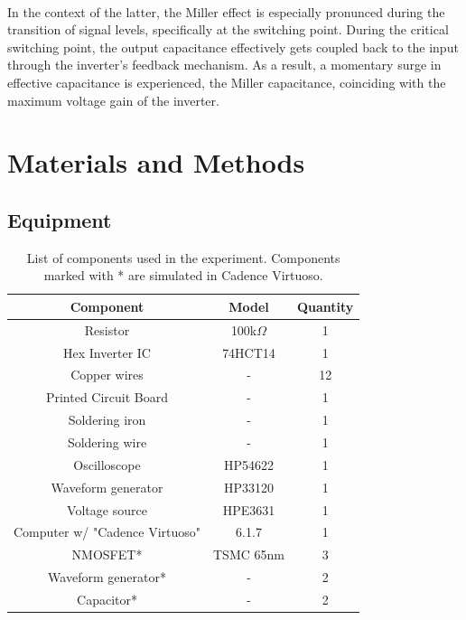 \documentclass[onecolumn]{article}
\begin{document}
\paragraph{} In the context of the latter, the Miller effect is especially pronunced during the transition of signal levels, specifically at the switching point. During the critical switching point, the output capacitance effectively gets coupled back to the input through the inverter's feedback mechanism. As a result, a momentary surge in effective capacitance is experienced, the Miller capacitance, coinciding with the maximum voltage gain of the inverter.


\section{Materials and Methods}
\subsection{Equipment}
\begin{table}[h!]
    \centering
    \begin{tabular}{|c|c|c|}
        \hline
        \textbf{Component} & \textbf{Model} & \textbf{Quantity} \\
        \hline
        Resistor & 100k$\Omega$ & 1 \\
        Hex Inverter IC & 74HCT14 & 1 \\
        Copper wires & - & 12 \\
        Printed Circuit Board & - & 1 \\
        Soldering iron & - & 1 \\
        Soldering wire & - & 1 \\
        Oscilloscope & HP54622 & 1 \\
        Waveform generator  & HP33120 & 1 \\
        Voltage source & HPE3631 & 1 \\
        Computer w/ "Cadence Virtuoso" & 6.1.7 & 1 \\
        NMOSFET* & TSMC 65nm & 3 \\
        Waveform generator* & - & 2 \\ 
        Capacitor* & - & 2 \\
        \hline
    \end{tabular}
    \caption{List of components used in the experiment. Components marked with * are simulated in Cadence Virtuoso.}
    \label{tab:bom}
\end{table}
\end{document}
